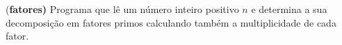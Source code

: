 \item{(\bf fatores)}
		 Programa que lê um número inteiro positivo $n$ e determina a sua decomposição em fatores primos calculando também a multiplicidade de cada fator.
